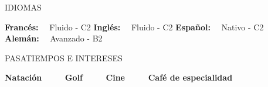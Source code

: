 \documentclass{resume} %
\begin{document}
%
%

\begin{rSection}{IDIOMAS}

{\bf Francés:} \ \ {Fluido - C2} \hfill {\bf Inglés:} \ \ {Fluido - C2} \hfill {\bf Español:} \ \ {Nativo - C2} \hfill {\bf Alemán:} \ \ {Avanzado - B2}

\end{rSection}

%
%




\begin{rSection}{PASATIEMPOS E INTERESES}

    {\bf Natación} \ \ \ \ \ {\bf Golf} \ \ \ \ \ {\bf Cine} \ \ \ \ \ {\bf Café de especialidad}
    
\end{rSection}
\end{document}
